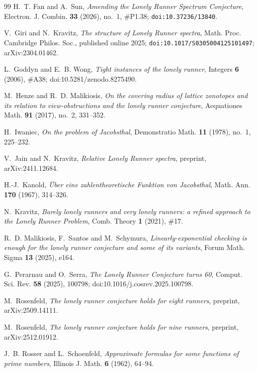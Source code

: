 \documentclass[11pt]{article}
\theoremstyle{definition}
\begin{document}
\begin{thebibliography}{99}
H.~T. Fan and A.~Sun, \emph{Amending the Lonely Runner Spectrum
Conjecture}, Electron. J. Combin. \textbf{33} (2026), no.~1, \#P1.38;
\texttt{doi:10.37236/13840}.

V.~Giri and N.~Kravitz, \emph{The structure of Lonely Runner spectra},
Math. Proc. Cambridge Philos. Soc., published online 2025;
\texttt{doi:10.1017/S0305004125101497}; arXiv:2304.01462.

L.~Goddyn and E.~B. Wong, \emph{Tight instances of the lonely runner},
Integers \textbf{6} (2006), \#A38; doi:10.5281/zenodo.8275490.

M.~Henze and R.~D. Malikiosis, \emph{On the covering radius of lattice
zonotopes and its relation to view-obstructions and the lonely runner
conjecture}, Aequationes Math. \textbf{91} (2017), no.~2, 331--352.

H.~Iwaniec, \emph{On the problem of Jacobsthal}, Demonstratio Math.
\textbf{11} (1978), no.~1, 225--232.

V.~Jain and N.~Kravitz, \emph{Relative Lonely Runner spectra},
preprint, arXiv:2411.12684.

H.-J.~Kanold, \emph{\"Uber eine zahlentheoretische Funktion von Jacobsthal},
Math. Ann. \textbf{170} (1967), 314--326.

N.~Kravitz, \emph{Barely lonely runners and very lonely runners: a refined
approach to the Lonely Runner Problem}, Comb. Theory \textbf{1} (2021), \#17.

R.~D. Malikiosis, F.~Santos and M.~Schymura, \emph{Linearly-exponential
checking is enough for the lonely runner conjecture and some of its
variants}, Forum Math. Sigma \textbf{13} (2025), e164.

G.~Perarnau and O.~Serra, \emph{The Lonely Runner Conjecture turns 60},
Comput. Sci. Rev. \textbf{58} (2025), 100798;
doi:10.1016/j.cosrev.2025.100798.

M.~Rosenfeld, \emph{The lonely runner conjecture holds for eight runners},
preprint, arXiv:2509.14111.

M.~Rosenfeld, \emph{The lonely runner conjecture holds for nine runners},
preprint, arXiv:2512.01912.

J.~B. Rosser and L.~Schoenfeld, \emph{Approximate formulas for some
functions of prime numbers}, Illinois J. Math. \textbf{6} (1962), 64--94.


\end{thebibliography}
\end{document}
